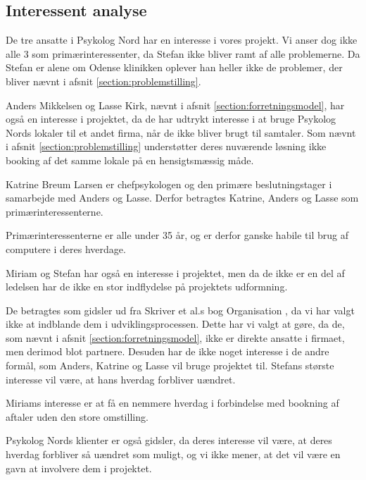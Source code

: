 \subsection{Interessent analyse}

De tre ansatte i Psykolog Nord har en interesse i vores projekt. Vi anser dog ikke alle 3 som primærinteressenter, da Stefan ikke bliver ramt af alle problemerne.
Da Stefan er alene om Odense klinikken oplever han heller ikke de problemer, der bliver nævnt i afsnit \ref{section:problemstilling}.

Anders Mikkelsen og Lasse Kirk, nævnt i afsnit \ref{section:forretningsmodel}, har også en interesse i projektet, da de har udtrykt interesse i at bruge Psykolog Nords lokaler til et andet firma, når de ikke bliver brugt til samtaler.
Som nævnt i afsnit \ref{section:problemstilling} understøtter deres nuværende løsning ikke booking af det samme lokale på en hensigtsmæssig måde.

Katrine Breum Larsen er chefpsykologen og den primære beslutningstager i samarbejde med Anders og Lasse.
Derfor betragtes Katrine, Anders og Lasse som primærinteressenterne.

Primærinteressenterne er alle under 35 år, og er derfor ganske habile til brug af computere i deres hverdage.

Miriam og Stefan har også en interesse i projektet, men da de ikke er en del af ledelsen har de ikke en stor indflydelse på projektets udformning.

De betragtes som gidsler ud fra Skriver et al.s bog Organisation \cite[s. 435]{interessentanalyse}, da vi har valgt ikke at indblande dem i udviklingsprocessen.
Dette har vi valgt at gøre, da de, som nævnt i afsnit \ref{section:forretningsmodel}, ikke er direkte ansatte i firmaet, men derimod blot partnere.
Desuden har de ikke noget interesse i de andre formål, som Anders, Katrine og Lasse vil bruge projektet til. 
Stefans største interesse vil være, at hans hverdag forbliver uændret.

Miriams interesse er at få en nemmere hverdag i forbindelse med bookning af aftaler uden den store omstilling.

Psykolog Nords klienter er også gidsler, da deres interesse vil være, at deres hverdag forbliver så uændret som muligt, og vi ikke mener, at det vil være en gavn at involvere dem i projektet.